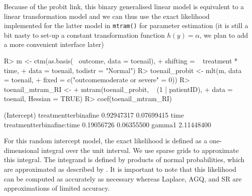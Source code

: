 \documentclass[article,nojss,shortnames]{jss}\usepackage[]{graphicx}\usepackage[]{xcolor}
\newcommand{\cmd}[1]{\texttt{#1()}}
\newcommand{\ry}{y}
\newcommand{\h}{h}
\begin{document}
Because of the probit link, this binary generalised linear model is
equivalent to a linear transformation model and we can thus use the exact
likelihood implemented for the latter model in \cmd{mtram} for parameter
estimation (it is still a bit nasty to set-up a constant transformation function
$\h(\ry) = \alpha$, we plan to add a more convenient interface later)
\begin{Schunk}
\begin{Sinput}
R> m <- ctm(as.basis(~ outcome, data = toenail), 
+           shifting = ~ treatment * time, 
+           data = toenail, todistr = "Normal")
R> toenail_probit <- mlt(m, data = toenail, 
+                        fixed = c("outcomemoderate or severe" = 0))
R> toenail_mtram_RI <- 
+      mtram(toenail_probit, ~ (1 | patientID), 
+            data = toenail, Hessian = TRUE)
R> coef(toenail_mtram_RI)
\end{Sinput}
\begin{Soutput}
              (Intercept)      treatmentterbinafine 
               0.92947317                0.07699415 
                     time treatmentterbinafine:time 
               0.19056726                0.06355500 
                   gamma1 
               2.11448400 
\end{Soutput}
\end{Schunk}
For this random intercept model, the exact likelihood is defined as a
one-dimensional integral over the unit interval.  We use sparse grids
\citep{Heiss_Winschel_2008, pkg:SparseGrid} to approximate this integral. 
The integrand is defined by products of normal probabilities, which are
approximated as described by \cite{Matic_Radoicic_2018}.  It is important to
note that this likelihood can be computed as accurately as necessary whereas
Laplace, AGQ, and SR are approximations of limited accuracy. 
\end{document}
